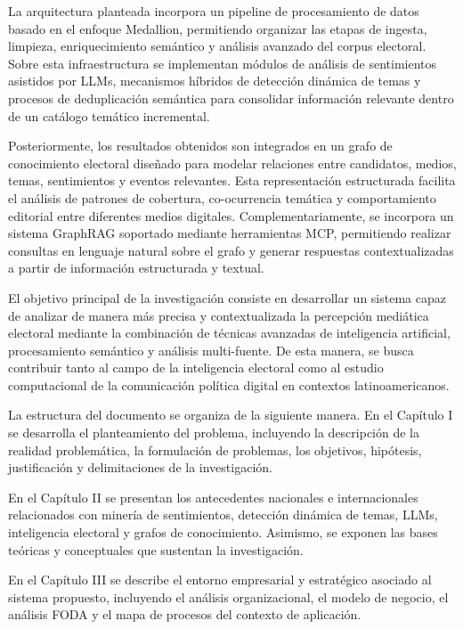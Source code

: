 La arquitectura planteada incorpora un pipeline de procesamiento de datos basado en el enfoque Medallion, permitiendo organizar las etapas de ingesta, limpieza, enriquecimiento semántico y análisis avanzado del corpus electoral. Sobre esta infraestructura se implementan módulos de análisis de sentimientos asistidos por LLMs, mecanismos híbridos de detección dinámica de temas y procesos de deduplicación semántica para consolidar información relevante dentro de un catálogo temático incremental.

Posteriormente, los resultados obtenidos son integrados en un grafo de conocimiento electoral diseñado para modelar relaciones entre candidatos, medios, temas, sentimientos y eventos relevantes. Esta representación estructurada facilita el análisis de patrones de cobertura, co-ocurrencia temática y comportamiento editorial entre diferentes medios digitales. Complementariamente, se incorpora un sistema GraphRAG soportado mediante herramientas MCP, permitiendo realizar consultas en lenguaje natural sobre el grafo y generar respuestas contextualizadas a partir de información estructurada y textual.

El objetivo principal de la investigación consiste en desarrollar un sistema capaz de analizar de manera más precisa y contextualizada la percepción mediática electoral mediante la combinación de técnicas avanzadas de inteligencia artificial, procesamiento semántico y análisis multi-fuente. De esta manera, se busca contribuir tanto al campo de la inteligencia electoral como al estudio computacional de la comunicación política digital en contextos latinoamericanos.

La estructura del documento se organiza de la siguiente manera. En el Capítulo I se desarrolla el planteamiento del problema, incluyendo la descripción de la realidad problemática, la formulación de problemas, los objetivos, hipótesis, justificación y delimitaciones de la investigación.

En el Capítulo II se presentan los antecedentes nacionales e internacionales relacionados con minería de sentimientos, detección dinámica de temas, LLMs, inteligencia electoral y grafos de conocimiento. Asimismo, se exponen las bases teóricas y conceptuales que sustentan la investigación.

En el Capítulo III se describe el entorno empresarial y estratégico asociado al sistema propuesto, incluyendo el análisis organizacional, el modelo de negocio, el análisis FODA y el mapa de procesos del contexto de aplicación.

